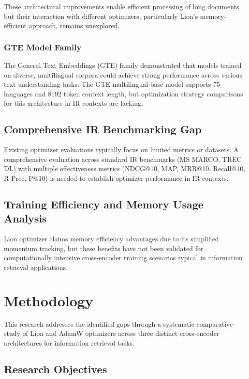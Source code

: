These architectural improvements enable efficient processing of long documents but their interaction with different optimizers, particularly Lion's memory-efficient approach, remains unexplored.

\subsubsection{GTE Model Family}
The General Text Embeddings (GTE) family \cite{li2023towards} demonstrated that models trained on diverse, multilingual corpora could achieve strong performance across various text understanding tasks. The GTE-multilingual-base model supports 75 languages and 8192 token context length, but optimization strategy comparisons for this architecture in IR contexts are lacking.

\subsection{Comprehensive IR Benchmarking Gap}

Existing optimizer evaluations typically focus on limited metrics or datasets. A comprehensive evaluation across standard IR benchmarks (MS MARCO, TREC DL) with multiple effectiveness metrics (NDCG@10, MAP, MRR@10, Recall@10, R-Prec, P@10) is needed to establish optimizer performance in IR contexts.

\subsection{Training Efficiency and Memory Usage Analysis}

Lion optimizer claims memory efficiency advantages due to its simplified momentum tracking, but these benefits have not been validated for computationally intensive cross-encoder training scenarios typical in information retrieval applications.

\section{Methodology}

This research addresses the identified gaps through a systematic comparative study of Lion and AdamW optimizers across three distinct cross-encoder architectures for information retrieval tasks.

\subsection{Research Objectives}

